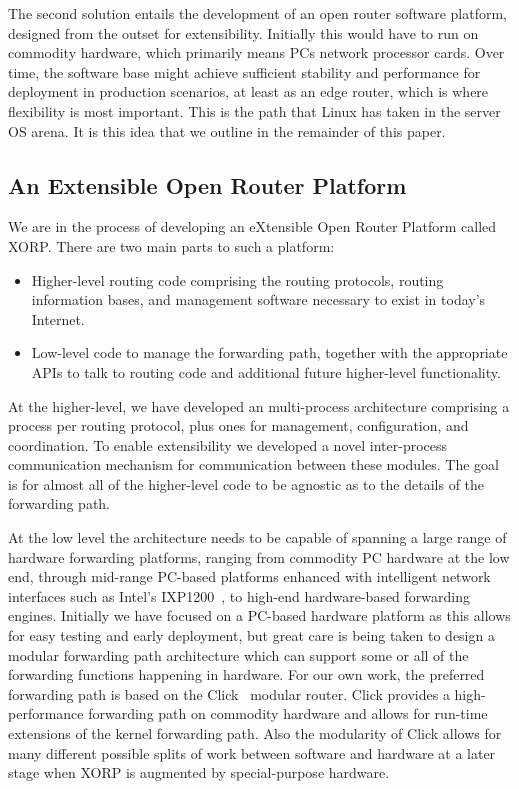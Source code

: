 The second solution entails the development of an open router software
platform, designed from the outset for extensibility.  Initially this
would have to run on commodity hardware, which primarily means PCs
network processor cards.  Over time, the software base might achieve
sufficient stability and performance for deployment in production
scenarios, at least as an edge router, which is where flexibility is
most important.  This is the path that Linux has taken in the server
OS arena.  It is this idea that we outline in the remainder of this paper.

\subsection{An Extensible Open Router Platform}
We are in the process of developing an eXtensible Open Router
Platform called XORP.  There are two main parts to such
a platform:
\begin{itemize}
\item Higher-level routing code comprising the routing protocols, routing
information bases, and management software necessary to exist in
today's Internet.
\item Low-level code to manage the forwarding path, together with the 
appropriate APIs to talk to routing code and additional future
higher-level functionality.
\end{itemize}
At the higher-level, we have developed an multi-process
architecture comprising a process per routing protocol, plus ones for
management, configuration, and coordination.  To enable extensibility
we developed a novel inter-process communication mechanism for
communication between these modules.  The goal is for almost all of
the higher-level code to be agnostic as to the details of the
forwarding path.
 
At the low level the architecture needs to be capable of spanning a
large range of hardware forwarding platforms, ranging from commodity
PC hardware at the low end, through mid-range PC-based platforms
enhanced with intelligent network interfaces such as Intel's
IXP1200~\cite{ixp1200}, to high-end hardware-based forwarding engines.
Initially we have focused on a PC-based hardware platform as this
allows for easy testing and early deployment, but great care is being
taken to design a modular forwarding path architecture which can
support some or all of the forwarding functions happening in hardware.
For our own work, the preferred forwarding path is based on the
Click~\cite{click} modular router.  Click provides a
high-performance forwarding path on commodity hardware and 
allows for run-time extensions of the kernel forwarding path.  Also the
modularity of Click allows for many different possible splits of work
between software and hardware at a later stage when XORP is augmented
by special-purpose hardware.

